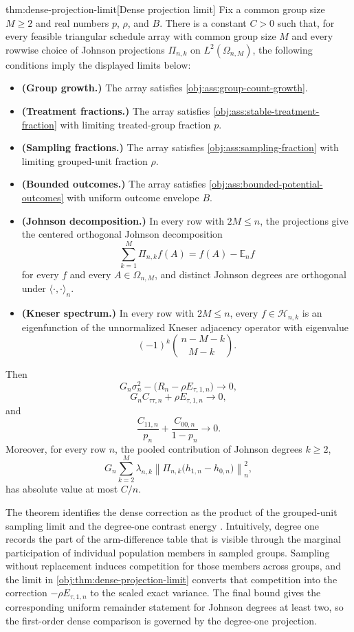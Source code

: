 \begin{theoremv}{thm:dense-projection-limit}[Dense projection limit]
Fix a common group size \(M\ge 2\) and real numbers \(p\), \(\rho\), and \(B\).  There is a constant \(C>0\) such that, for every feasible triangular schedule array with common group size \(M\) and every rowwise choice of Johnson projections \(\Pi_{n,k}\) on \(L^2(\Omega_{n,M})\), the following conditions imply the displayed limits below:
\begin{itemize}
\item \textbf{(Group growth.)} The array satisfies \cref{obj:ass:group-count-growth}.
\item \textbf{(Treatment fractions.)} The array satisfies \cref{obj:ass:stable-treatment-fraction} with limiting treated-group fraction \(p\).
\item \textbf{(Sampling fractions.)} The array satisfies \cref{obj:ass:sampling-fraction} with limiting grouped-unit fraction \(\rho\).
\item \textbf{(Bounded outcomes.)} The array satisfies \cref{obj:ass:bounded-potential-outcomes} with uniform outcome envelope \(B\).
\item \textbf{(Johnson decomposition.)} In every row with \(2M\le n\), the projections give the centered orthogonal Johnson decomposition
\[
\sum_{k=1}^{M}\Pi_{n,k}f(A)=f(A)-\mathbb E_n f
\]
for every \(f\) and every \(A\in\Omega_{n,M}\), and distinct Johnson degrees are orthogonal under \(\langle\cdot,\cdot\rangle_n\).
\item \textbf{(Kneser spectrum.)} In every row with \(2M\le n\), every \(f\in\mathcal H_{n,k}\) is an eigenfunction of the unnormalized Kneser adjacency operator with eigenvalue
\[
(-1)^k {\,n-M-k\choose M-k\,}.
\]
\end{itemize}
Then
\[
G_n\sigma_n^2-\bigl(R_n-\rho E_{\tau,1,n}\bigr)\to 0,
\]
\[
G_nC_{\tau\tau,n}+\rho E_{\tau,1,n}\to 0,
\]
and
\[
\frac{C_{11,n}}{p_n}+\frac{C_{00,n}}{1-p_n}\to 0.
\]
Moreover, for every row \(n\), the pooled contribution of Johnson degrees \(k\ge 2\),
\[
G_n\sum_{k=2}^{M}\lambda_{n,k}
\left\|\Pi_{n,k}\bigl(h_{1,n}-h_{0,n}\bigr)\right\|_{n}^{2},
\]
has absolute value at most \(C/n\).
\end{theoremv}

The theorem identifies the dense correction as the product of the grouped-unit sampling limit and the degree-one contrast energy . Intuitively, degree one records the part of the arm-difference table that is visible through the marginal participation of individual population members in sampled groups. Sampling without replacement induces competition for those members across groups, and the limit in \cref{obj:thm:dense-projection-limit} converts that competition into the correction \(-\rho E_{\tau,1,n}\) to the scaled exact variance. The final bound gives the corresponding uniform remainder statement for Johnson degrees at least two, so the first-order dense comparison is governed by the degree-one projection.

